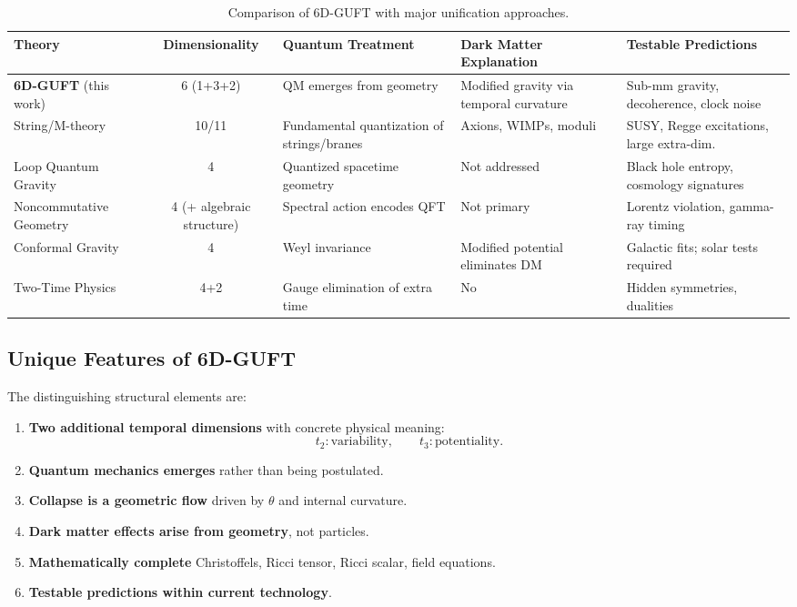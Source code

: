 \documentclass[12pt]{article}
\begin{document}
\begin{table}[h]
\centering
\caption{Comparison of 6D-GUFT with major unification approaches.}
\begin{tabular}{p{3.5cm}cp{3cm}p{3cm}p{3cm}}
\toprule
\textbf{Theory} & \textbf{Dimensionality} & \textbf{Quantum Treatment} 
& \textbf{Dark Matter Explanation} & \textbf{Testable Predictions} \\
\midrule
\textbf{6D-GUFT} (this work) & 6 (1+3+2) & QM emerges from geometry 
& Modified gravity via temporal curvature 
& Sub-mm gravity, decoherence, clock noise \\
\hline
String/M-theory & 10/11 & Fundamental quantization of strings/branes 
& Axions, WIMPs, moduli & SUSY, Regge excitations, large extra-dim.\\
\hline
Loop Quantum Gravity & 4 & Quantized spacetime geometry 
& Not addressed & Black hole entropy, cosmology signatures \\
\hline
Noncommutative Geometry & 4 (+ algebraic structure) 
& Spectral action encodes QFT 
& Not primary & Lorentz violation, gamma-ray timing \\
\hline
Conformal Gravity & 4 & Weyl invariance 
& Modified potential eliminates DM 
& Galactic fits; solar tests required \\
\hline
Two-Time Physics & 4+2 & Gauge elimination of extra time 
& No & Hidden symmetries, dualities \\
\bottomrule
\end{tabular}
\label{tab:comparison-final}
\end{table}

\subsection{Unique Features of 6D-GUFT}

The distinguishing structural elements are:
\begin{enumerate}
\item \textbf{Two additional temporal dimensions} with concrete physical meaning:
\[
t_2: \text{variability}, \qquad
t_3: \text{potentiality}.
\]

\item \textbf{Quantum mechanics emerges} rather than being postulated.

\item \textbf{Collapse is a geometric flow} driven by \(\theta\) and internal curvature.

\item \textbf{Dark matter effects arise from geometry}, not particles.

\item \textbf{Mathematically complete} Christoffels, Ricci tensor, Ricci scalar, field equations.

\item \textbf{Testable predictions within current technology}.
\end{enumerate}
\end{document}
